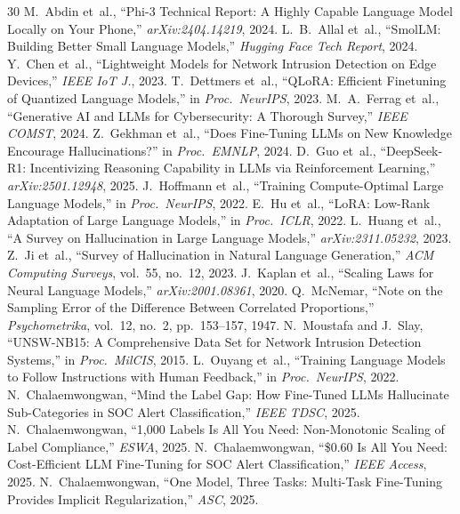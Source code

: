 \documentclass[review,3p]{elsarticle}
\begin{document}
\begin{thebibliography}{30}
 M.~Abdin et~al., ``Phi-3 Technical Report: A Highly Capable Language Model Locally on Your Phone,'' \emph{arXiv:2404.14219}, 2024.
 L.~B.~Allal et~al., ``SmolLM: Building Better Small Language Models,'' \emph{Hugging Face Tech Report}, 2024.
 Y.~Chen et~al., ``Lightweight Models for Network Intrusion Detection on Edge Devices,'' \emph{IEEE IoT J.}, 2023.
 T.~Dettmers et~al., ``QLoRA: Efficient Finetuning of Quantized Language Models,'' in \emph{Proc.\ NeurIPS}, 2023.
 M.~A.~Ferrag et~al., ``Generative AI and LLMs for Cybersecurity: A Thorough Survey,'' \emph{IEEE COMST}, 2024.
 Z.~Gekhman et~al., ``Does Fine-Tuning LLMs on New Knowledge Encourage Hallucinations?'' in \emph{Proc.\ EMNLP}, 2024.
 D.~Guo et~al., ``DeepSeek-R1: Incentivizing Reasoning Capability in LLMs via Reinforcement Learning,'' \emph{arXiv:2501.12948}, 2025.
 J.~Hoffmann et~al., ``Training Compute-Optimal Large Language Models,'' in \emph{Proc.\ NeurIPS}, 2022.
 E.~Hu et~al., ``LoRA: Low-Rank Adaptation of Large Language Models,'' in \emph{Proc.\ ICLR}, 2022.
 L.~Huang et~al., ``A Survey on Hallucination in Large Language Models,'' \emph{arXiv:2311.05232}, 2023.
 Z.~Ji et~al., ``Survey of Hallucination in Natural Language Generation,'' \emph{ACM Computing Surveys}, vol.~55, no.~12, 2023.
 J.~Kaplan et~al., ``Scaling Laws for Neural Language Models,'' \emph{arXiv:2001.08361}, 2020.
 Q.~McNemar, ``Note on the Sampling Error of the Difference Between Correlated Proportions,'' \emph{Psychometrika}, vol.~12, no.~2, pp.~153--157, 1947.
 N.~Moustafa and J.~Slay, ``UNSW-NB15: A Comprehensive Data Set for Network Intrusion Detection Systems,'' in \emph{Proc.\ MilCIS}, 2015.
 L.~Ouyang et~al., ``Training Language Models to Follow Instructions with Human Feedback,'' in \emph{Proc.\ NeurIPS}, 2022.
 N.~Chalaemwongwan, ``Mind the Label Gap: How Fine-Tuned LLMs Hallucinate Sub-Categories in SOC Alert Classification,'' \emph{IEEE TDSC}, 2025.
 N.~Chalaemwongwan, ``1,000 Labels Is All You Need: Non-Monotonic Scaling of Label Compliance,'' \emph{ESWA}, 2025.
 N.~Chalaemwongwan, ``\$0.60 Is All You Need: Cost-Efficient LLM Fine-Tuning for SOC Alert Classification,'' \emph{IEEE Access}, 2025.
 N.~Chalaemwongwan, ``One Model, Three Tasks: Multi-Task Fine-Tuning Provides Implicit Regularization,'' \emph{ASC}, 2025.

\end{thebibliography}
\end{document}

